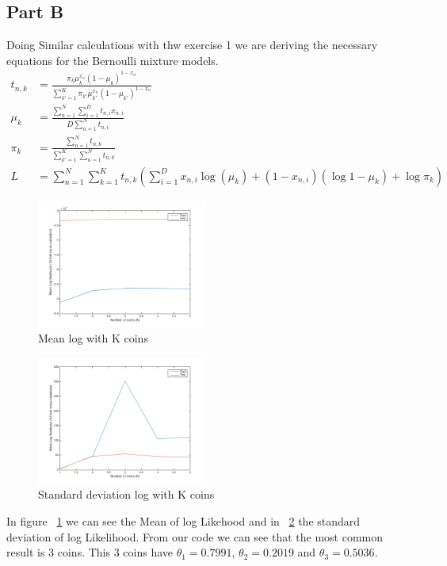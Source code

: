 \subsection*{Part B}
Doing Similar calculations with thw exercise 1 we are deriving the necessary
equations for the Bernoulli mixture models.
\begin{align*}
t_{n,k} &= \frac{\pi_{k}\mu_{k}^{x_{n}} (1-\mu_{k})^{1-x_{n}}}{\sum_{k'=1}^K \pi_{k'} \mu_{k'}^{x_{n}}(1-\mu_{k'})^{1-x_n}}\\
\mu_{k} &= \frac{\sum_{n=1}^N\sum_{i=1}^{D} t_{n,i}x_{n,i}}{D\sum_{n=1}^N t_{n,i}}\\
\pi_{k} &= \frac{\sum_{n=1}^{N}t_{n,k}}{\sum_{k'=1}^K\sum_{n=1}^{N}t_{n,k}}\\
L &= \sum_{n=1}^{N}\sum_{k=1}^{K}t_{n,k}(\sum_{i=1}^{D}x_{n,i}\log(\mu_{k})+(1-x_{n,i})(\log{1-\mu_{k}}) + \log\pi_{k})
\end{align*}
\begin{figure}[ht]
\centering
    \includegraphics[width=0.5\textwidth]{figures/mean_log.png}
    \caption{Mean log with K coins}
    \label{fig:mean}
\end{figure}
\begin{figure}[ht]
\centering
    \includegraphics[width=0.5\textwidth]{figures/std_log.png}
    \caption{Standard deviation log with K coins}
    \label{fig:std}
\end{figure}
In figure ~\ref{fig:mean} we can see the Mean of log Likehood and in ~\ref{fig:std} the standard deviation of log Likelihood.
From our code we can see that the most common result is 3 coins. This 3 coins have $\theta_1 = 0.7991$, $\theta_2 = 0.2019$ and
$\theta_3 = 0.5036$.
